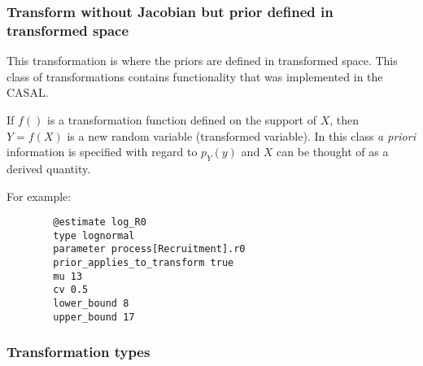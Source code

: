 \subsubsection*{Transform without Jacobian but prior defined in transformed space}

This transformation is where the priors are defined in transformed space. This class of transformations contains functionality that was implemented in the CASAL.

If $f()$ is a transformation function defined on the support of $X$, then $Y = f(X)$ is a new random variable (transformed variable). In this class \textit{a priori} information is specified with regard to $p_Y(y)$ and $X$ can be thought of as a derived quantity.

For example:

{\small{\begin{verbatim}
		@estimate log_R0
		type lognormal
		parameter process[Recruitment].r0
		prior_applies_to_transform true
		mu 13
		cv 0.5
		lower_bound 8
		upper_bound 17
		\end{verbatim}}}


\subsubsection*{Transformation types}

